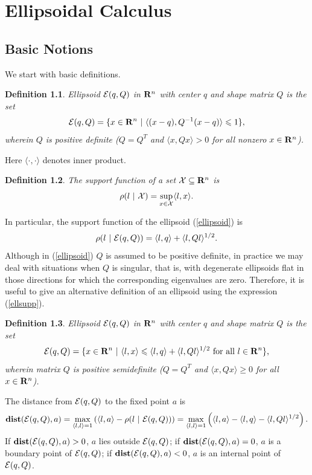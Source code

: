 \documentclass{report}
\newtheorem{df}{Definition}[section]
\newcommand{\bd}{\begin{df}}
\newcommand{\ed}{\end{df}}
\newcommand{\EE}{{\cal E}}
\newcommand{\XX}{{\cal X}}
\begin{document}
\chapter{Ellipsoidal Calculus}
\section{Basic Notions}
We start with basic definitions.
\bd
Ellipsoid $\EE(q,Q)$ in ${\bf R}^n$ with  center $q$
and  shape matrix $Q$ is the set
\begin{equation}
\EE(q,Q) = \{ x \in {\bf R}^n ~|~ \langle (x-q), Q^{-1}(x-q)\rangle\leq1 \},
\label{ellipsoid}
\end{equation}
wherein  $Q$ is positive definite ($Q=Q^T$ and $\langle x, Qx\rangle>0$
for all nonzero $x\in{\bf R}^n$).
\label{ellipsoiddef0}
\ed
Here $\langle\cdot,\cdot\rangle$ denotes inner product.
\bd
The support function of a set $\XX\subseteq{\bf R}^n$ is
\[ \rho(l~|~\XX) = \sup_{x\in\XX} \langle l,x\rangle. \]
\ed
In particular, the support function of the ellipsoid (\ref{ellipsoid}) is
\begin{equation}
\rho(l~|~\EE(q,Q)) = \langle l, q\rangle + \langle l, Ql\rangle^{1/2}.
\label{ellsupp}
\end{equation}
Although in (\ref{ellipsoid})    $Q$ is assumed to be
positive definite, in practice we may deal with situations when $Q$ is
singular, that is, with degenerate ellipsoids flat in those directions
for which the corresponding eigenvalues are zero. Therefore, it is
useful to give an alternative definition of an ellipsoid using the
expression (\ref{ellsupp}).
\bd
Ellipsoid $\EE(q,Q)$ in ${\bf R}^n$ with  center $q$
and  shape matrix $Q$ is the set
\begin{equation}
\EE(q,Q) = \{ x \in {\bf R}^n ~|~
\langle l,x\rangle\leq\langle l,q\rangle + \langle l,Ql\rangle^{1/2}
\mbox{ for all } l\in{\bf R}^n \},
\label{ellipsoid2}
\end{equation}
wherein matrix $Q$ is positive semidefinite
($Q=Q^T$ and $\langle x, Qx\rangle\geq0$ for all $x\in{\bf R}^n$).
\label{ellipsoiddef}
\ed
The distance from $\EE(q,Q)$ to the fixed point $a$ is
\begin{equation}
{\bf dist}(\EE(q,Q),a) = \max_{\langle l,l\rangle=1}\left(\langle l,a\rangle -
\rho(l ~|~ \EE(q,Q)) \right) =
\max_{\langle l,l\rangle=1}\left(\langle l,a\rangle - \langle l,q\rangle -
\langle l,Ql\rangle^{1/2}\right). \label{dist_point}
\end{equation}
If ${\bf dist}(\EE(q,Q),a) > 0$, $a$ lies outside  $\EE(q,Q)$;
if ${\bf dist}(\EE(q,Q),a) = 0$, $a$ is a boundary point of $\EE(q,Q)$;
if ${\bf dist}(\EE(q,Q),a) < 0$, $a$ is an internal point of $\EE(q,Q)$.
\end{document}
